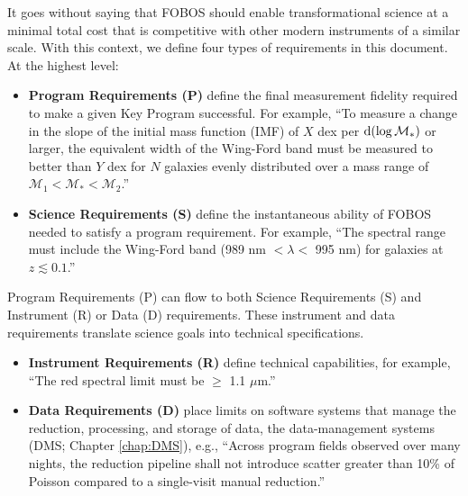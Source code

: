 \documentclass[11pt,a4paper,twoside,onecolumn,openany,final,oldfontcommands]{memoir}
\begin{document}
\noindent It goes without saying that FOBOS should enable transformational science at a minimal total cost that is competitive with other modern instruments of a similar scale. With this context, we define four types of requirements in this document.  At the highest level:

\begin{itemize}
\item \textbf{Program Requirements (P)} define the final measurement fidelity required to make a given Key Program successful. For example, ``To measure a change in the slope of the initial mass function (IMF) of $X$ dex per ${\rm d}(\log\mathcal{M}_\ast)$ or larger, the equivalent width of the Wing-Ford band must be measured to better than $Y$ dex for $N$ galaxies evenly distributed over a mass range of $\mathcal{M}_1 < \mathcal{M}_\ast < \mathcal{M}_2$.''  

\item \textbf{Science Requirements (S)} define the instantaneous ability of FOBOS needed to satisfy a program requirement.  For example, ``The spectral range must include the Wing-Ford band (989 nm $< \lambda <$ 995 nm) for galaxies at $z \lesssim 0.1$.''  
\end{itemize}

\noindent Program Requirements (P) can flow to both Science Requirements (S) and Instrument (R) or Data (D) requirements.  These instrument and data requirements translate science goals into technical specifications.


\begin{itemize}
\item \textbf{Instrument Requirements (R)} define technical capabilities, for example, ``The red spectral limit must be $\geq$ 1.1 $\mu$m.'' 

\item \textbf{Data Requirements (D)} place limits on software systems that manage the reduction, processing, and storage of data, the data-management systems (DMS; Chapter \ref{chap:DMS}), e.g., ``Across program fields observed over many nights, the reduction pipeline shall not introduce scatter greater than 10\% of Poisson compared to a single-visit manual reduction.'' 
\end{itemize}
\end{document}
